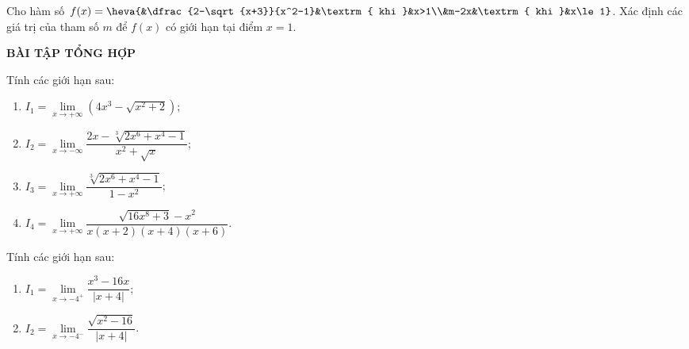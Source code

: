 \begin{bt}%
Cho hàm số $f(x)=\heva{&\dfrac{2-\sqrt{x+3}}{x^2-1}&\textrm{ khi }&x>1\\&m-2x&\textrm{ khi }&x\le 1}$. Xác định các giá trị của tham số $m$ để $f(x)$ có giới hạn tại điểm $x=1$.
\end{bt}
\begin{center}
\textbf{BÀI TẬP TỔNG HỢP}
\end{center}
\begin{bt}%
Tính các giới hạn sau:
\begin{multicols}{2}
\begin{enumerate}
\item $I_1=\lim\limits_{x\to +\infty} (4x^3-\sqrt{x^2+2})$;
\item $I_2=\lim\limits_{x\to -\infty} \dfrac{2x-\sqrt[3]{2x^6+x^4-1}}{x^2+\sqrt{x}}$;
\item $I_3=\lim\limits_{x\to +\infty} \dfrac{\sqrt[3]{2x^6+x^4-1}}{1-x^2}$;
\item $I_4=\lim\limits_{x\to +\infty} \dfrac{\sqrt{16x^8+3}-x^2}{x(x+2)(x+4)(x+6)}$.
\end{enumerate}
\end{multicols}
\end{bt}

\begin{bt}%
Tính các giới hạn sau:
\begin{multicols}{2}
\begin{enumerate}
\item $I_1=\lim\limits_{x\to -4^+} \dfrac{x^3-16x}{|x+4|}$;
\item $I_2=\lim\limits_{x\to -4^-} \dfrac{\sqrt{x^2-16}}{|x+4|}$.
\end{enumerate}
\end{multicols}
\end{bt}

